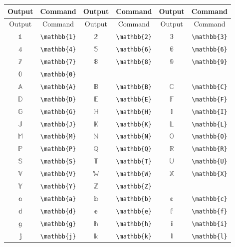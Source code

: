 \documentclass[oneside,a4paper]{article}
\begin{document}
	\begin{longtable}{cccccc}
		\\\hline
		Output&Command&Output&Command&Output&Command\\\hline
		\endfirsthead%
		\hline
		Output&Command&Output&Command&Output&Command\\\hline
		\endhead%
		\hline\endfoot%
		$\mathbb{1}$&\verb|\mathbb{1}|&$\mathbb{2}$&\verb|\mathbb{2}|&$\mathbb{3}$&\verb|\mathbb{3}|\\
		$\mathbb{4}$&\verb|\mathbb{4}|&		$\mathbb{5}$&\verb|\mathbb{6}|&$\mathbb{6}$&\verb|\mathbb{6}|\\
		$\mathbb{7}$&\verb|\mathbb{7}|&$\mathbb{8}$&\verb|\mathbb{8}|&		$\mathbb{9}$&\verb|\mathbb{9}|\\
		$\mathbb{0}$&\verb|\mathbb{0}|&&&& \\\hline
		$\mathbb{A}$&\verb|\mathbb{A}|&$\mathbb{B}$&\verb|\mathbb{B}|&$\mathbb{C}$&\verb|\mathbb{C}|\\
		$\mathbb{D}$&\verb|\mathbb{D}|&		$\mathbb{E}$&\verb|\mathbb{E}|&$\mathbb{F}$&		\verb|\mathbb{F}|\\
		$\mathbb{G}$&\verb|\mathbb{G}|&$\mathbb{H}$&\verb|\mathbb{H}|&		$\mathbb{I}$&\verb|\mathbb{I}|\\
		$\mathbb{J}$&\verb|\mathbb{J}|&$\mathbb{K}$&\verb|\mathbb{K}|&$\mathbb{L}$&\verb|\mathbb{L}| \\
		$\mathbb{M}$&\verb|\mathbb{M}|&$\mathbb{N}$&\verb|\mathbb{N}|&$\mathbb{O}$&\verb|\mathbb{O}|\\
		$\mathbb{P}$&\verb|\mathbb{P}|&		$\mathbb{Q}$&\verb|\mathbb{Q}|&$\mathbb{R}$&\verb|\mathbb{R}|\\
		$\mathbb{S}$&\verb|\mathbb{S}|&$\mathbb{T}$&\verb|\mathbb{T}|&		$\mathbb{U}$&\verb|\mathbb{U}|\\
		$\mathbb{V}$&\verb|\mathbb{V}|&$\mathbb{W}$&\verb|\mathbb{W}|&$\mathbb{X}$&\verb|\mathbb{X}| \\
		$\mathbb{Y}$&\verb|\mathbb{Y}|&$\mathbb{Z}$&\verb|\mathbb{Z}|&&\\\hline
		$\mathbb{a}$&\verb|\mathbb{a}|&$\mathbb{b}$&\verb|\mathbb{b}|&$\mathbb{c}$&\verb|\mathbb{c}|\\
		$\mathbb{d}$&\verb|\mathbb{d}|&		$\mathbb{e}$&\verb|\mathbb{e}|&$\mathbb{f}$&\verb|\mathbb{f}|\\
		$\mathbb{g}$&\verb|\mathbb{g}|&$\mathbb{h}$&\verb|\mathbb{h}|&		$\mathbb{i}$&\verb|\mathbb{i}|\\
		$\mathbb{j}$&\verb|\mathbb{j}|&$\mathbb{k}$&\verb|\mathbb{k}|&$\mathbb{l}$&\verb|\mathbb{l}| \\

\end{longtable}
\end{document}
